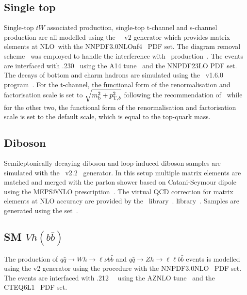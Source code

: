 \subsection{Single top}

\par Single-top $tW$ associated production, single-top t-channel and s-channel production are all modelled using the \powhegbox~\cite{Frederix:2012dh,Nason:2004rx,Frixione:2007vw,Alioli:2010xd}~v2
generator which provides matrix elements at NLO\
with the NNPDF3.0NLOnf4~\cite{Ball:2014uwa} PDF set.
The diagram removal scheme~\cite{Frixione:2008yi} was employed to handle the interference with \ttbar\ production~\cite{ATL-PHYS-PUB-2016-020}.
The events are interfaced with \pythia.230~\cite{Sjostrand:2014zea} using the A14 tune~\cite{ATL-PHYS-PUB-2014-021} and the NNPDF23LO PDF set.
The decays of bottom and charm hadrons are simulated using the \evtgen\ v1.6.0 program~\cite{EvtGen}.
For the t-channel, the functional form of the renormalisation and factorisation scale is set to $\sqrt{m_{\textrm{b}}^2 + p_{{\textrm T},b}^2}$
following the recommendation of~\cite{Frederix:2012dh} while for the other two, the functional form of the renormalisation and factorisation scale is set to the default scale, which is equal to the top-quark mass.

\subsection{Diboson}

\par Semileptonically decaying diboson and loop-induced diboson samples are simulated with the
\sherpa~v2.2~\cite{Bothmann:2019yzt} generator. In this setup multiple
matrix elements are matched and merged with the \sherpa parton shower
based on Catani-Seymour dipole~\cite{Gleisberg:2008fv,Schumann:2007mg}
using the MEPS@NLO
prescription~\cite{Hoeche:2011fd,Hoeche:2012yf,Catani:2001cc,Hoeche:2009rj}. 
The virtual QCD correction for matrix elements at NLO accuracy are
provided by the \openloops\ library~\cite{Cascioli:2011va,Denner:2016kdg}. 
library~\cite{Denner:2016kdg}. Samples are generated using the
\nnpdfnnlo set~\cite{Ball:2014uwa}.

\subsection{SM $Vh(b\bar{b})$}

\par The production of $q\bar{q}\to Wh\to \ell\nu b\bar{b}$ and $q\bar{q}\to Zh\to \ell\ell b\bar{b}$ events is modelled using the \powhegbox v2 generator
\cite{Alioli:2010xd} using the \minlo procedure \cite{Hamilton:2012np,Luisoni:2013kna} with the NNPDF3.0NLO~\cite{Ball:2014uwa} PDF set.
The events are interfaced with \pythia.212~\cite{Sjostrand:2014zea}~ using the AZNLO tune~\cite{Aad:2014xaa} and the CTEQ6L1~\cite{Pumplin:2002vw} PDF set.

